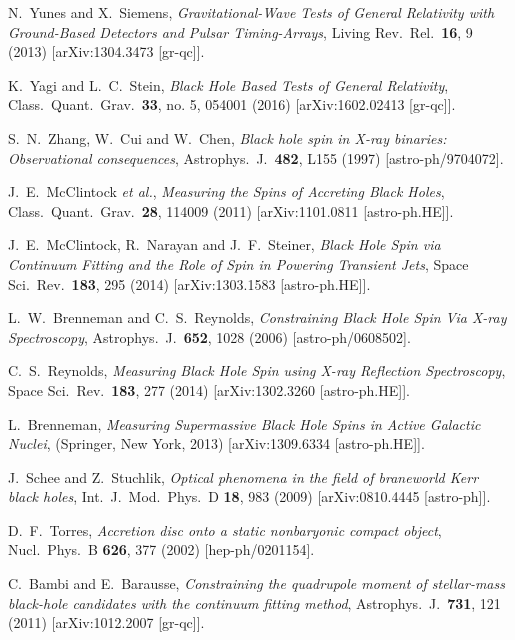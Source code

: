 \documentclass[11pt,a4paper,pdftex]{article}
\begin{document}
\begin{thebibliography}{99}
  N.~Yunes and X.~Siemens,
  {\it Gravitational-Wave Tests of General Relativity with Ground-Based Detectors and Pulsar Timing-Arrays},
  Living Rev.\ Rel.\  {\bf 16}, 9 (2013)
  [arXiv:1304.3473 [gr-qc]].   
  
  K.~Yagi and L.~C.~Stein,
  {\it Black Hole Based Tests of General Relativity},
  Class.\ Quant.\ Grav.\  {\bf 33}, no. 5, 054001 (2016)
  [arXiv:1602.02413 [gr-qc]].     
  
  S.~N.~Zhang, W.~Cui and W.~Chen,
  {\it Black hole spin in X-ray binaries: Observational consequences},
  Astrophys.\ J.\  {\bf 482}, L155 (1997)
  [astro-ph/9704072].  
  
  J.~E.~McClintock {\it et al.},
  {\it Measuring the Spins of Accreting Black Holes},
  Class.\ Quant.\ Grav.\  {\bf 28}, 114009 (2011)
  [arXiv:1101.0811 [astro-ph.HE]].  

  J.~E.~McClintock, R.~Narayan and J.~F.~Steiner,
  {\it Black Hole Spin via Continuum Fitting and the Role of Spin in Powering Transient Jets},
  Space Sci.\ Rev.\  {\bf 183}, 295 (2014)
  [arXiv:1303.1583 [astro-ph.HE]].
  
  L.~W.~Brenneman and C.~S.~Reynolds,
  {\it Constraining Black Hole Spin Via X-ray Spectroscopy},
  Astrophys.\ J.\  {\bf 652}, 1028 (2006)
  [astro-ph/0608502].  
  
  C.~S.~Reynolds,
  {\it Measuring Black Hole Spin using X-ray Reflection Spectroscopy},
  Space Sci.\ Rev.\  {\bf 183}, 277 (2014)
  [arXiv:1302.3260 [astro-ph.HE]].  

  L.~Brenneman,
  {\it Measuring Supermassive Black Hole Spins in Active Galactic Nuclei},
  (Springer, New York, 2013)
  [arXiv:1309.6334 [astro-ph.HE]].
  
  J.~Schee and Z.~Stuchlik,
  {\it Optical phenomena in the field of braneworld Kerr black holes},
  Int.\ J.\ Mod.\ Phys.\ D {\bf 18}, 983 (2009)
  [arXiv:0810.4445 [astro-ph]].  
  
  D.~F.~Torres,
  {\it Accretion disc onto a static nonbaryonic compact object},
  Nucl.\ Phys.\ B {\bf 626}, 377 (2002)
  [hep-ph/0201154].   
  
  C.~Bambi and E.~Barausse,
  {\it Constraining the quadrupole moment of stellar-mass black-hole candidates with the continuum fitting method},
  Astrophys.\ J.\  {\bf 731}, 121 (2011)
  [arXiv:1012.2007 [gr-qc]].  
  

\end{thebibliography}
\end{document}

